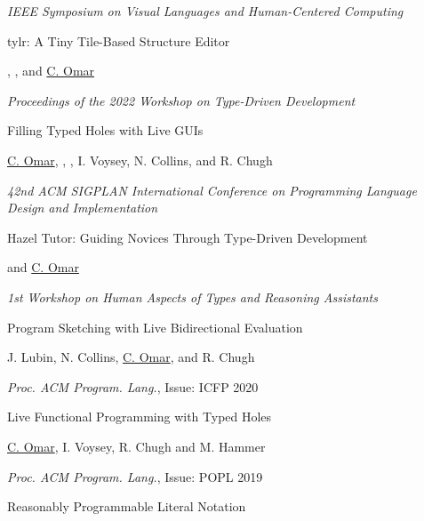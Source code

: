 \documentclass[10pt,letterpaper]{article}
\renewenvironment{itemize}{
  \begin{list}{}{
    \setlength{\leftmargin}{1.25em}
    \setlength{\itemsep}{0.25em}
    \setlength{\parskip}{0pt}
    \setlength{\parsep}{0.2em}
  }
}{
  \end{list}
}
\begin{document}
\begin{enumerate}[leftmargin=*, labelindent=6.5em, font=\bfseries]
\begin{itemize}
          \item \textit{IEEE Symposium on Visual Languages and Human-Centered Computing} 
        \end{itemize}
  \item[TyDe 2022] {tylr: A Tiny Tile-Based Structure Editor}
        \begin{itemize} 
          \item {}, , and \underline{C. Omar}
          \item \textit{Proceedings of the 2022 Workshop on Type-Driven Development}
        \end{itemize}
  \item[PLDI 2021] {Filling Typed Holes with Live GUIs}
        \begin{itemize}
          \item \underline{C. Omar}, , , I. Voysey, N. Collins, and R. Chugh
          \item \textit{42nd ACM SIGPLAN International Conference on Programming Language Design and Implementation}
        \end{itemize}
  \item[HATRA 2020] Hazel Tutor: Guiding Novices Through Type-Driven Development
        \begin{itemize}
          \item {} and \underline{C. Omar}
          \item \textit{1st Workshop on Human Aspects of Types and Reasoning Assistants}
        \end{itemize}
  \item[ICFP 2020] {Program Sketching with Live Bidirectional Evaluation}
        \begin{itemize}
          \item J. Lubin, N. Collins, \underline{C. Omar}, and R. Chugh
          \item \textit{Proc. ACM Program. Lang.}, Issue: ICFP 2020
        \end{itemize}
  \item[POPL 2019] {Live Functional Programming with Typed Holes}
        \begin{itemize}
          \item \underline{C. Omar}, I. Voysey, R. Chugh and M. Hammer
          \item \textit{Proc. ACM Program. Lang.}, Issue: POPL 2019
        \end{itemize}
  \item[ICFP 2018] {Reasonably Programmable Literal Notation}

\end{enumerate}
\end{document}
